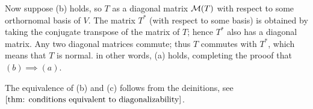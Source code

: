 \begin{prf}
   Now suppose (b) holds, so $T$ as a diagonal matrix $\mathcal{M}(T)$ with respect to some orthornomal basis of $V$. The matrix $T^*$ (with respect to some basis) is obtained by taking the conjugate transpose of the matrix of $T$; hence $T^*$ also has a diagonal matrix. Any two diagonal matrices commute; thus $T$ commutes with $T^*$, which means that $T$ is normal. in other words, (a) holds, completing the prooof that $(b) \implies (a)$.

   The equivalence of (b) and (c) follows from the deinitions, see $\ref{thm: conditions equivalent to diagonalizability}$.
\end{prf}
